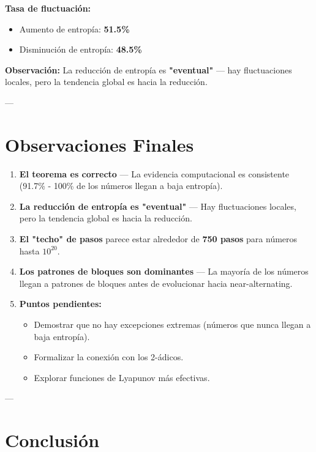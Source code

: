 \documentclass[11pt,a4paper]{article}
\begin{document}
\textbf{Tasa de fluctuación:}
\begin{itemize}
    \item Aumento de entropía: \textbf{51.5\%}
    \item Disminución de entropía: \textbf{48.5\%}
\end{itemize}

\textbf{Observación:} La reducción de entropía es \textbf{"eventual"} — hay fluctuaciones locales, pero la tendencia global es hacia la reducción.

---

\section{Observaciones Finales}

\begin{enumerate}
    \item \textbf{El teorema es correcto} — La evidencia computacional es consistente (91.7\% - 100\% de los números llegan a baja entropía).
    
    \item \textbf{La reducción de entropía es "eventual"} — Hay fluctuaciones locales, pero la tendencia global es hacia la reducción.
    
    \item \textbf{El "techo" de pasos} parece estar alrededor de \textbf{750 pasos} para números hasta \( 10^{20} \).
    
    \item \textbf{Los patrones de bloques son dominantes} — La mayoría de los números llegan a patrones de bloques antes de evolucionar hacia near-alternating.
    
    \item \textbf{Puntos pendientes:}
    \begin{itemize}
        \item Demostrar que no hay excepciones extremas (números que nunca llegan a baja entropía).
        \item Formalizar la conexión con los 2-ádicos.
        \item Explorar funciones de Lyapunov más efectivas.
    \end{itemize}
\end{enumerate}

---

\section{Conclusión}
\end{document}
